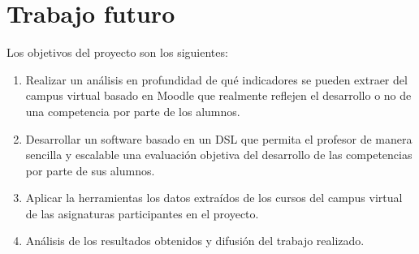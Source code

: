 \section{Trabajo futuro} %
Los objetivos del proyecto son los siguientes:
\begin{enumerate}
\item Realizar un análisis en profundidad de qué indicadores se pueden extraer del campus virtual basado en Moodle que realmente reflejen el desarrollo o no de una competencia por parte de los alumnos.
\item Desarrollar un software basado en un DSL que permita el profesor de manera sencilla y escalable una evaluación objetiva del desarrollo de las competencias por parte de sus alumnos.
\item Aplicar la herramientas los datos extraídos de los cursos del campus virtual de las asignaturas participantes en el proyecto.
\item Análisis de los resultados obtenidos y difusión del trabajo realizado.
\end{enumerate}



